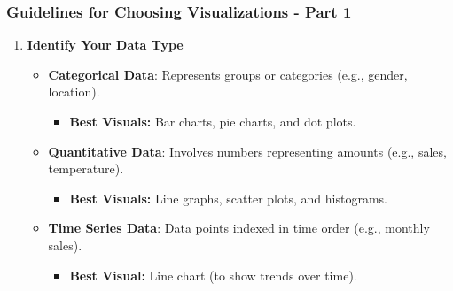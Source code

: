 \documentclass{beamer}
\begin{document}
\begin{frame}[fragile]
    \frametitle{Guidelines for Choosing Visualizations - Part 1}
    \begin{enumerate}
        \item \textbf{Identify Your Data Type}
            \begin{itemize}
                \item \textbf{Categorical Data}: Represents groups or categories (e.g., gender, location).
                    \begin{itemize}
                        \item \textbf{Best Visuals:} Bar charts, pie charts, and dot plots.
                    \end{itemize}
                \item \textbf{Quantitative Data}: Involves numbers representing amounts (e.g., sales, temperature).
                    \begin{itemize}
                        \item \textbf{Best Visuals:} Line graphs, scatter plots, and histograms.
                    \end{itemize}
                \item \textbf{Time Series Data}: Data points indexed in time order (e.g., monthly sales).
                    \begin{itemize}
                        \item \textbf{Best Visual:} Line chart (to show trends over time).
                    \end{itemize}
            \end{itemize}
    \end{enumerate}
\end{frame}
\end{document}
